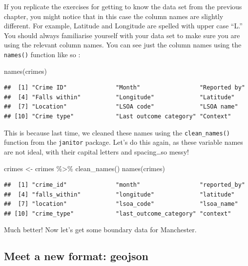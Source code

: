 \documentclass[
]{book}
\makeatletter
\newenvironment{Shaded}{\begin{snugshade}}{\end{snugshade}}
\newcommand{\FunctionTok}[1]{\textcolor[rgb]{0,0,0}{#1}}
\newcommand{\NormalTok}[1]{#1}
\newcommand{\OtherTok}[1]{\textcolor[rgb]{0.37,0.37,0.37}{#1}}
\newcommand{\SpecialCharTok}[1]{\textcolor[rgb]{0,0,0}{#1}}
\newenvironment{kframe}{%
\medskip{}
\setlength{\fboxsep}{.8em}
 \def\at@end@of@kframe{}%
 \ifinner\ifhmode%
  \def\at@end@of@kframe{\end{minipage}}%
  \begin{minipage}{\columnwidth}%
 \fi\fi%
 \def\FrameCommand##1{\hskip\@totalleftmargin \hskip-\fboxsep
 \colorbox{shadecolor}{##1}\hskip-\fboxsep
     \hskip-\linewidth \hskip-\@totalleftmargin \hskip\columnwidth}%
 \MakeFramed {\advance\hsize-\width
   \@totalleftmargin\z@ \linewidth\hsize
   \@setminipage}}%
 {\par\unskip\endMakeFramed%
 \at@end@of@kframe}
\renewenvironment{Shaded}{\begin{kframe}}{\end{kframe}}
\makeatother
\begin{document}
If you replicate the exercises for getting to know the data set from the previous chapter, you might notice that in this case the column names are slightly different. For example, Latitude and Longitude are spelled with upper case ``L.'' You should always familiarise yourself with your data set to make sure you are using the relevant column names. You can see just the column names using the \texttt{names()} function like so :

\begin{Shaded}
\begin{Highlighting}[]
\FunctionTok{names}\NormalTok{(crimes)}
\end{Highlighting}
\end{Shaded}

\begin{verbatim}
##  [1] "Crime ID"              "Month"                 "Reported by"          
##  [4] "Falls within"          "Longitude"             "Latitude"             
##  [7] "Location"              "LSOA code"             "LSOA name"            
## [10] "Crime type"            "Last outcome category" "Context"
\end{verbatim}

This is because last time, we cleaned these names using the \texttt{clean\_names()} function from the \texttt{janitor} package. Let's do this again, as these variable names are not ideal, with their capital letters and spacing\ldots so messy!

\begin{Shaded}
\begin{Highlighting}[]
\NormalTok{crimes }\OtherTok{\textless{}{-}}\NormalTok{ crimes }\SpecialCharTok{\%\textgreater{}\%} 
  \FunctionTok{clean\_names}\NormalTok{()}
\FunctionTok{names}\NormalTok{(crimes)}
\end{Highlighting}
\end{Shaded}

\begin{verbatim}
##  [1] "crime_id"              "month"                 "reported_by"          
##  [4] "falls_within"          "longitude"             "latitude"             
##  [7] "location"              "lsoa_code"             "lsoa_name"            
## [10] "crime_type"            "last_outcome_category" "context"
\end{verbatim}

Much better! Now let's get some boundary data for Manchester.

\hypertarget{meet-a-new-format-geojson}{%
\subsection{Meet a new format: geojson}\label{meet-a-new-format-geojson}}
\end{document}
